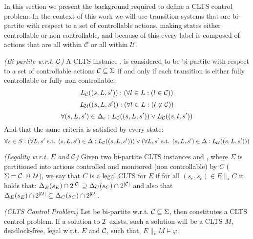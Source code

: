 In this section we present the background required to define a CLTS control problem.  In the context of this work we will use transition systems that are bi-partite with respect to a set of controllable actions, making states either controllable or non controllable, and because of this every label is composed of actions that are all within $\mathcal{C}$ or all within $\mathcal{U}$. 

\begin{definition}\label{def:bi-partite_clts} \emph{(Bi-partite w.r.t. $\mathcal{C}$)} 
A CLTS instance \cltsDef, is considered to be bi-partite with respect to a set of controllable actions $\mathcal{C} \subseteq \Sigma$ if and only if each transition is either fully controllable or fully non controllable:
\[ L_{\mathcal{C}}((s,L,s')): ( \forall l \in L:(l \in \mathcal{C}))\]
\[ L_{\mathcal{U}}((s,L,s')): ( \forall l \in L:(l \not\in \mathcal{C}))\]
\[ \forall (s,L,s') \in \Delta_e: L_{\mathcal{C}}((s,L,s')) \vee L_{\mathcal{C}}((s,l,s')) \]
And that the same criteria is satisfied by every state:
\[ \forall s \in S : (\forall L, s' \text{ s.t. } (s,L,s') \in \Delta:L_{\mathcal{C}}((s,L,s')))\vee (\forall L, s' \text{ s.t. } (s,L,s') \in \Delta:L_{\mathcal{U}}((s,L,s')))\]
\end{definition}

\begin{definition}
	\label{def:legal_clts} \emph{(Legality w.r.t. $E$ and $\mathcal{C}$)} 
	Given two bi-partite CLTS instances  and , where $\Sigma$ is partitioned into actions controlled and monitored (non controllable) by $C$ ($\Sigma=\mathcal{C} \; \uplus \;\mathcal{U}$), we say that $C$ is a legal CLTS for $E$ if for all $(s_e,s_c) \in E \parallel_* C$ it holds that:
	$\Delta_{E}(s_E)\cap 2^{|\mathcal{C}|} \supseteq \Delta_{C}(s_C)\cap 2^{|\mathcal{C}|}$ and also that  $\Delta_{E}(s_E)\cap 2^{|\mathcal{U}|} \subseteq \Delta_{C}(s_C)\cap 2^{|\mathcal{U}|}$.
\end{definition}

\begin{definition}
	\label{def:clts_control_problem} \emph{(CLTS Control Problem)} 
	Let  be bi-partite w.r.t. $\mathcal{C} \subseteq \Sigma$, then \controlProblemDef constitutes a CLTS control problem. If a solution to $\mathcal{I}$ exists, such a solution will be a CLTS $M$, deadlock-free, legal w.r.t. $E$ and $\mathcal{C}$, such that, $E \parallel_* M \models \varphi$.
\end{definition}
